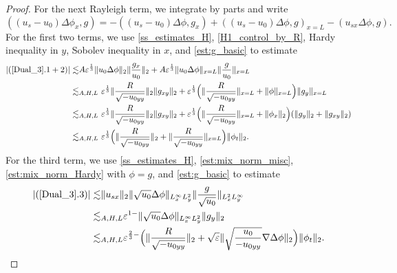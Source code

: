 \documentclass[reqno, 11pt]{amsart}
\theoremstyle{plain}
\theoremstyle{definition}
\theoremstyle{remark}
\numberwithin{equation}{section}
\begin{document}
\begin{proof}
For the next Rayleigh term, we integrate by parts and write
\begin{equation}\label{Dual_3}
((u_s - u_0) \Delta \phi_x,g) = - ((u_s - u_0) \Delta \phi, g_x) + ((u_s- u_0) \Delta \phi ,g)_{x=L} - (u_{sx} \Delta \phi, g).
\end{equation}
For the first two terms, we use \eqref{ss_estimates_H}, \eqref{H1_control_by_R}, Hardy inequality in $y$, Sobolev inequality in $x$, and \eqref{est:g_basic} to estimate
\begin{equation}\label{Dual_3-1}
\begin{aligned}
|(\ref{Dual_3}.1+2)| \lesssim& A \varepsilon^{\frac{1}{3}} \| u_0 \Delta \phi\|_2 \| \frac{g_x}{u_0}\|_2 + A \varepsilon^{\frac{1}{3}} \| u_0 \Delta \phi\|_{x=L} \| \frac{g}{u_0}\|_{x=L}\\
\lesssim&_{A,H,L}~ \varepsilon^{\frac{1}{3}} \| \frac{R}{\sqrt{-u_{0yy}}} \|_2 \| g_{xy}\|_2 + \varepsilon^{\frac{1}{3}} \Big( \| \frac{R}{\sqrt{-u_{0yy}}} \|_{x=L} + \| \phi\|_{x=L} \Big) \| g_y\|_{x=L}\\
\lesssim&_{A,H,L}~ \varepsilon^{\frac{1}{3}} \| \frac{R}{\sqrt{-u_{0yy}}} \|_2 \| g_{xy}\|_2 + \varepsilon^{\frac{1}{3}} \Big( \| \frac{R}{\sqrt{-u_{0yy}}} \|_{x=L} + \| \phi_x\|_{2} \Big) (\| g_y\|_{2} + \|g_{xy}\|_2)\\
\lesssim&_{A,H,L}~ \varepsilon^{\frac{1}{3}} \Big( \| \frac{R}{\sqrt{-u_{0yy}}} \|_2 +  \| \frac{R}{\sqrt{-u_{0yy}}} \|_{x=L} \Big) \| \phi_t\|_2.
\end{aligned}
\end{equation}
For the third term, we use \eqref{ss_estimates_H}, \eqref{est:mix_norm_misc}, \eqref{est:mix_norm_Hardy} with $\phi = g$, and \eqref{est:g_basic} to estimate
\begin{equation}\label{Dual_3-2}
\begin{aligned}
|(\ref{Dual_3}.3)| \lesssim& \|u_{sx}\|_2 \| \sqrt{u_0} \Delta \phi\|_{L^\infty_x L^2_y} \| \frac{g}{\sqrt{u_0}}\|_{L^2_x L^\infty_y}\\
\lesssim&_{A,H,L} \varepsilon^{1-} \| \sqrt{u_0} \Delta \phi\|_{L^\infty_x L^2_y}  \|g_y\|_2\\
\lesssim&_{A,H,L} \varepsilon^{\frac{2}{3}-} \Big( \|\frac{R}{\sqrt{-u_{0yy}}}\|_2 + \sqrt{\varepsilon} \| \sqrt{\frac{u_0}{-u_{0yy}}} \nabla \Delta \phi\|_2\Big) \|\phi_t\|_2.
\end{aligned}
\end{equation}


\end{proof}
\end{document}
